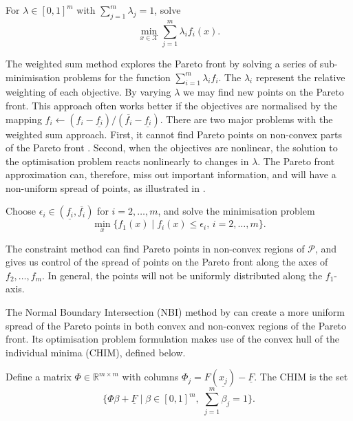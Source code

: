 \documentclass[main.tex]{subfiles}
\begin{document}
\begin{mydef}
  For $\lambda \in {[0,1]}^m$ with $\sum_{j=1}^m\lambda_j = 1$, solve
  \begin{equation}
    \min_{x\in\mathcal{X}} \sum_{j=1}^m \lambda_i f_i(x).
  \end{equation}
\end{mydef}
The weighted sum method explores the Pareto front by solving a series
of sub-minimisation problems for the function $\sum_{i=1}^m\lambda_i f_i$.
The $\lambda_i$ represent the relative weighting of each
objective. By varying $\lambda$  we may find new points on the Pareto front.
This approach often works better if the objectives are normalised by the
mapping $f_i\leftarrow (f_i-\underline
{f_i})/(\overline{f_i}-\underline{f_i})$.
There are two major problems with the weighted sum approach. First,
it cannot find Pareto points on non-convex parts of the Pareto
front \citep{messac2000aggregate}.
Second, when the objectives are nonlinear, the solution to the
optimisation problem reacts nonlinearly to changes in $\lambda$.
The Pareto front approximation can, therefore, miss out important
information, and will
have a non-uniform spread of points, as illustrated in
.

\begin{mydef}
  Choose
  $\epsilon_i\in(\underline{f_i},\overline{f_i})$ for $i=2,\dots,m$, and
  solve the minimisation problem
  \begin{equation}\label{eq:pareto_constraint_method}
    \min_x\{f_1(x)\mid f_i(x)\leq \epsilon_i,\, i=2,\dots,m\}.
  \end{equation}
\end{mydef}
The constraint method can find Pareto points in non-convex regions of
$\mathcal{P}$, and gives us control of the spread of points on the Pareto front
along the axes of $f_2,\dots,f_m$. In general, the points will not be
uniformly distributed along the $f_1$-axis.

The Normal Boundary Intersection (NBI) method by \citet{das1998normal} can
create a more uniform spread of the Pareto points in both convex and
non-convex regions of the Pareto front. Its optimisation problem
formulation makes use of the convex hull of the individual minima
(CHIM), defined below.
\begin{mydef}
  Define a matrix $\Phi\in\mathbb{R}^{m\times m}$ with columns
  $\Phi_j = F(\underline{x_j})-\underline{F}$.
  The CHIM is the set
  \begin{equation}\textstyle
    \{\Phi\beta + \underline{F} \mid \beta\in{[0,1]}^m,\;\sum_{j=1}^m\beta_j = 1\}.
  \end{equation}
\end{mydef}
\end{document}
